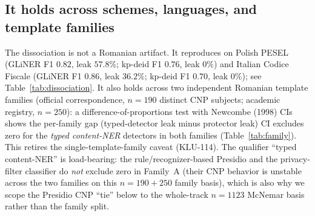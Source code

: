 \documentclass[11pt]{article}
\begin{document}
\subsection{It holds across schemes, languages, and template families}
The dissociation is not a Romanian artifact. It reproduces on Polish PESEL (GLiNER F1 $0.82$,
leak $57.8\%$; kp-deid F1 $0.76$, leak $0\%$) and Italian Codice Fiscale (GLiNER F1 $0.86$, leak
$36.2\%$; kp-deid F1 $0.70$, leak $0\%$); see Table~\ref{tab:dissociation}. It also holds across two
independent Romanian template families (official correspondence, $n{=}190$ distinct CNP subjects;
academic registry, $n{=}250$): a difference-of-proportions test with Newcombe (1998) CIs shows the
per-family gap (typed-detector leak minus protector leak) CI excludes zero for the \emph{typed
content-NER} detectors in both families (Table~\ref{tab:family}). This retires the
single-template-family caveat (KLU-114). The qualifier ``typed content-NER'' is load-bearing: the
rule/recognizer-based Presidio and the privacy-filter classifier do \emph{not} exclude zero in
Family~A (their CNP behavior is unstable across the two families on this $n{=}190{+}250$ family
basis), which is also why we scope the Presidio CNP ``tie'' below to the whole-track $n{=}1123$
McNemar basis rather than the family split.
\end{document}
